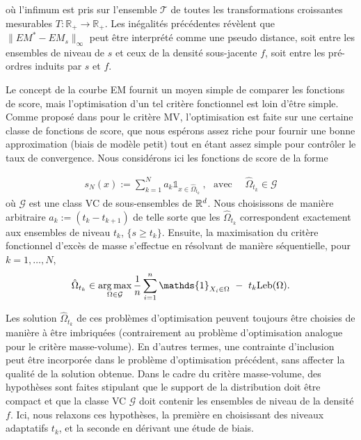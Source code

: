 où l'infimum est pris sur l'ensemble $ \mathcal {T} $ de toutes les transformations croissantes mesurables $T: \mathbb {R} _ + \rightarrow \mathbb {R} _ + $.
Les inégalités précédentes révèlent que $ \| EM ^ * - EM_s \| _ \infty $ peut être interprété comme une pseudo distance, soit entre les ensembles de niveau de $ s $ et ceux de la densité sous-jacente $ f $, soit entre les pré-ordres induits par $ s $ et $ f $.

Le concept de la courbe EM fournit un moyen simple de comparer les fonctions de score, mais l'optimisation d'un tel critère fonctionnel est loin d'être simple. Comme proposé dans \cite {CLEM13} pour le critère MV, l'optimisation est faite sur une certaine classe de fonctions de score, que nous espérons assez riche pour fournir une bonne approximation (biais de modèle petit) tout en étant assez simple pour contrôler le taux de convergence. Nous considérons ici les fonctions de score de la forme

\begin{align*}
s_N(x):= \sum_{k=1}^N a_k \mathds{1}_{x \in \hat{\Omega}_{t_k} }~, ~~~\text{avec ~~~} \hat{\Omega}_{t_k}  \in \mathcal{G}
\end{align*}
où $\mathcal{G}$ est une class VC de sous-ensembles de $\mathbb{R}^d$.
Nous choisissons de manière arbitraire $a_k:= (t_k-t_{k+1})$ de telle sorte que les $\hat{\Omega}_{t_k}$ correspondent exactement aux ensembles de niveau $t_k$, $\{s \ge t_k\}$. Ensuite, la maximisation du critère fonctionnel d'excès de masse s'effectue en résolvant de manière séquentielle, pour $k=1,\ldots,N$,
\begin{align*}
\hat \Omega_{t_k} \in \argmax_{\Omega \in \mathcal{G}} \frac{1}{n}\sum_{i=1}^n\mathds{1}_{X_i \in \Omega}~-~t_k \leb(\Omega).
\end{align*}

Les solution $ \hat \Omega_ {t_k} $ de ces problèmes d'optimisation peuvent toujours être choisies de manière à être imbriquées (contrairement au problème d'optimisation analogue pour le critère masse-volume). En d'autres termes, une contrainte d'inclusion peut être incorporée dans le problème d'optimisation précédent, sans affecter la qualité de la solution obtenue. Dans le cadre du critère masse-volume, des hypothèses sont faites stipulant que le support de la distribution doit être compact et que la classe VC $ \mathcal {G} $ doit contenir les ensembles de niveau de la densité $f$. Ici, nous relaxons ces hypothèses, la première en choisissant des niveaux adaptatifs $ t_k $, et la seconde en dérivant une étude de biais. %



